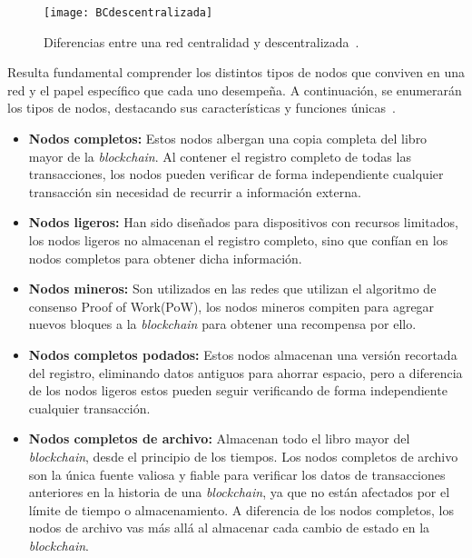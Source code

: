\begin{figure}[h]
	\centering
	\texttt{[image: BCdescentralizada]}
	\caption[Tipos de redes]{Diferencias entre una red centralidad y descentralizada~\cite{tiposRedes}.}
	\label{fig:BCdescentralizada}
\end{figure}


Resulta fundamental comprender los distintos tipos de nodos que conviven en una red y el papel específico que cada uno desempeña. A continuación, se enumerarán los tipos de nodos, destacando sus características y funciones únicas~\cite{tiposNodos}.

\begin{itemize}
\item \textbf{Nodos completos:} Estos nodos albergan una copia completa del libro mayor de la \textit{blockchain}. Al contener el registro completo de todas las transacciones, los nodos pueden verificar de forma independiente cualquier transacción sin necesidad de recurrir a información externa.

\item \textbf{Nodos ligeros:} Han sido diseñados para dispositivos con recursos limitados, los nodos ligeros no almacenan el registro completo, sino que confían en los nodos completos para obtener dicha información.

\item \textbf{Nodos mineros:} Son utilizados en las redes que utilizan el algoritmo de consenso Proof of Work(PoW), los nodos mineros compiten para agregar nuevos bloques a la \textit{blockchain} para obtener una recompensa por ello.

\item \textbf{Nodos completos podados:} Estos nodos almacenan una versión recortada del registro, eliminando datos antiguos para ahorrar espacio, pero a diferencia de los nodos ligeros estos pueden seguir verificando de forma independiente cualquier transacción. 

\item \textbf{Nodos completos de archivo:} Almacenan todo el libro mayor del \textit{blockchain}, desde el principio de los tiempos. Los nodos completos de archivo son la única fuente valiosa y fiable para verificar los datos de transacciones anteriores en la historia de una \textit{blockchain}, ya que no están afectados por el límite de tiempo o almacenamiento.
A diferencia de los nodos completos, los nodos de archivo vas más allá al almacenar cada cambio de estado en la \textit{blockchain}.


\end{itemize}
